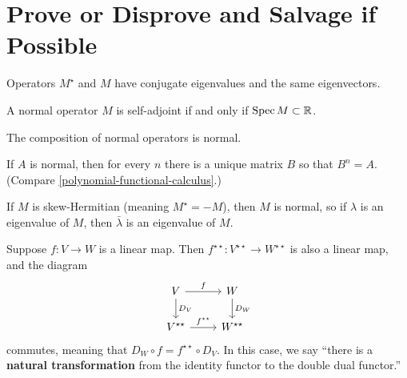 \documentclass{homework}
\begin{document}

\section{Prove or Disprove and Salvage if Possible}

\begin{problem}%
  Operators $M^\star$ and $M$ have conjugate eigenvalues and the same eigenvectors.
\end{problem}

\begin{problem}
  A normal operator $M$ is self-adjoint if and only if $\operatorname{Spec} M \subset \mathbb{R}$.
\end{problem}

\begin{problem}
  The composition of normal operators is normal.
\end{problem}

\begin{problem}%
  If $A$ is normal, then for every $n$ there is a unique matrix $B$ so that $B^n = A$.  (Compare \ref{polynomial-functional-calculus}.)
\end{problem}

\begin{problem}%
  If $M$ is skew-Hermitian (meaning $M^\star = -M$), then $M$ is
  normal, so if $\lambda$ is an eigenvalue of $M$, then
  $\bar{\lambda}$ is an eigenvalue of $M$.
\end{problem}

\begin{problem}\label{natural-transformation-to-double-dual}Suppose $f : V \to W$ is a linear map.  Then $f^{\star\star} : V^{\star\star} \to W^{\star\star}$ is also a linear map, and the diagram
  \[\begin{tikzcd}
      V \arrow{r}{f} \arrow{d}{D_V} & W \arrow{d}{D_W} \\
      V^{\star\star} \arrow{r}{f^{\star\star}}  & W^{\star\star}
    \end{tikzcd}\] commutes, meaning that
  $D_W \circ f = f^{\star\star} \circ D_V$.  In this case, we say
  ``there is a \textbf{natural transformation} from the identity
  functor to the double dual functor.''
\end{problem}
\end{document}
